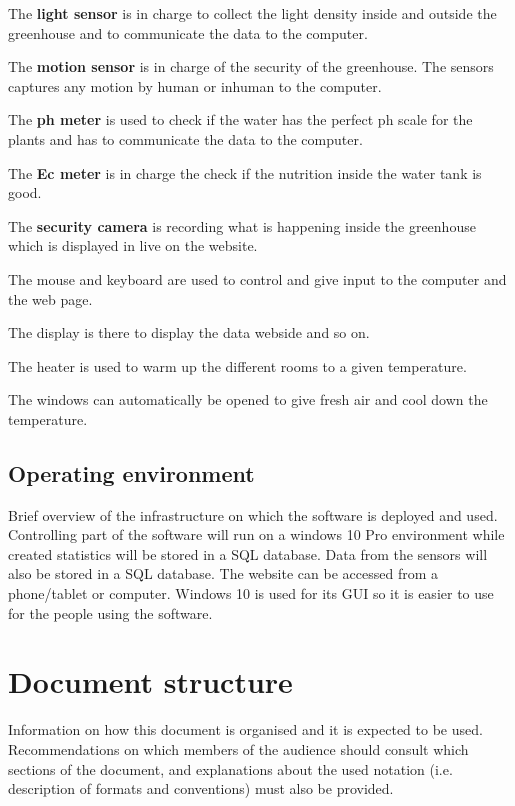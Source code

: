 \noindent The \textbf{light sensor} is in charge to collect the light density
 inside and outside the greenhouse and to communicate the data to the
 computer.

\noindent The \textbf{motion sensor} is  in charge of the security of the
greenhouse. The sensors captures any motion by human or inhuman to the
computer.


\noindent The \textbf{ph meter} is used to check if the water has the perfect ph
scale for the plants and has to communicate the data to the computer.

\noindent The \textbf{Ec meter} is in charge the check if the nutrition inside
the water tank is good.

\noindent The \textbf{security camera} is recording what is happening inside the
greenhouse which is displayed in live on the website.

\noindent The mouse and keyboard are used to control and give input to the
computer and the web page.

\noindent The display is there to display the data webside and so on. 

\noindent The heater is used to warm up the different rooms to a given
temperature.

\noindent The windows can automatically be opened to give fresh air and cool
down the temperature.


\subsection{Operating environment}
Brief overview of the infrastructure on which the software is deployed and used.
Controlling part of the software will run on a windows 10 Pro environment while
created statistics will be stored in a SQL database. Data from the sensors will
also be stored in a SQL database. The website can be accessed from a
phone/tablet or computer. Windows 10 is used for its GUI so it is easier to use
for the people using the software.

\section{Document structure}  
Information on how this document is organised and it is expected to be
used. Recommendations on which members of the audience
should consult which sections of the document, and explanations about the used
notation (i.e. description of formats and conventions) must also be provided.
